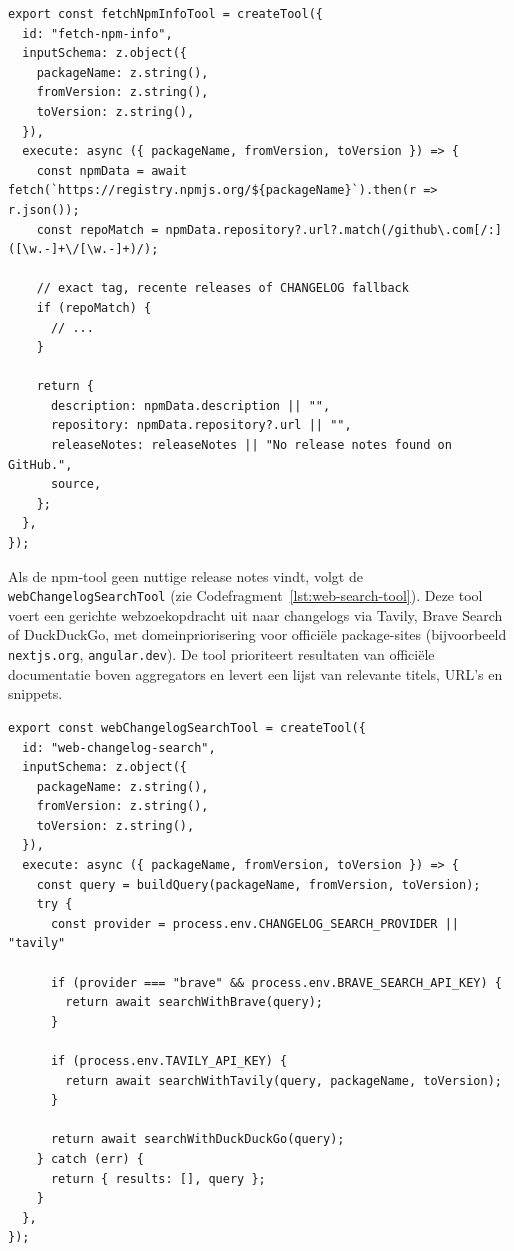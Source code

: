 \begin{listing}[H]
\begin{verbatim}
export const fetchNpmInfoTool = createTool({
  id: "fetch-npm-info",
  inputSchema: z.object({
    packageName: z.string(),
    fromVersion: z.string(),
    toVersion: z.string(),
  }),
  execute: async ({ packageName, fromVersion, toVersion }) => {
    const npmData = await fetch(`https://registry.npmjs.org/${packageName}`).then(r => r.json());
    const repoMatch = npmData.repository?.url?.match(/github\.com[/:]([\w.-]+\/[\w.-]+)/);

    // exact tag, recente releases of CHANGELOG fallback
    if (repoMatch) {
      // ...
    }

    return {
      description: npmData.description || "",
      repository: npmData.repository?.url || "",
      releaseNotes: releaseNotes || "No release notes found on GitHub.",
      source,
    };
  },
});
\end{verbatim}
\caption{Codefragment: \texttt{fetchNpmInfoTool} met npm-metadata en fallbacklogica}
\label{lst:npm-tool}
\end{listing}

Als de npm-tool geen nuttige release notes vindt, volgt de \texttt{webChangelogSearchTool} (zie Codefragment~\ref{lst:web-search-tool}). Deze tool voert een gerichte webzoekopdracht uit naar changelogs via Tavily, Brave Search of DuckDuckGo, met domeinpriorisering voor officiële package-sites (bijvoorbeeld \texttt{nextjs.org}, \texttt{angular.dev}). De tool prioriteert resultaten van officiële documentatie boven aggregators en levert een lijst van relevante titels, URL's en snippets.

\begin{listing}[H]
\begin{verbatim}
export const webChangelogSearchTool = createTool({
  id: "web-changelog-search",
  inputSchema: z.object({
    packageName: z.string(),
    fromVersion: z.string(),
    toVersion: z.string(),
  }),
  execute: async ({ packageName, fromVersion, toVersion }) => {
    const query = buildQuery(packageName, fromVersion, toVersion);
    try {
      const provider = process.env.CHANGELOG_SEARCH_PROVIDER || "tavily"

      if (provider === "brave" && process.env.BRAVE_SEARCH_API_KEY) {
        return await searchWithBrave(query);
      }

      if (process.env.TAVILY_API_KEY) {
        return await searchWithTavily(query, packageName, toVersion);
      }

      return await searchWithDuckDuckGo(query);
    } catch (err) {
      return { results: [], query };
    }
  },
});
\end{verbatim}
\caption{Codefragment: \texttt{webChangelogSearchTool} voor webzoekopdrachten naar changelogs}
\label{lst:web-search-tool}
\end{listing}

